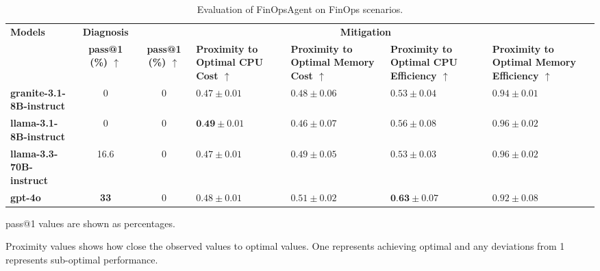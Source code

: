 \begin{table*}[h]
\small
\centering
\begin{threeparttable}
  \caption{Evaluation of FinOpsAgent on FinOps scenarios.}
  \label{tab:finopsagent-eval}
  \begin{tabular}{@{}lccp{1.85cm}p{1.85cm}p{1.85cm}p{1.85cm}@{}}
    \toprule
    \multirow{2}{*}{\textbf{Models}} 
      & \multicolumn{1}{c}{\textbf{Diagnosis}}
      & \multicolumn{5}{c}{\textbf{Mitigation}} \\
    \cmidrule(lr){2-2}\cmidrule(lr){3-7}
     & \textbf{pass@1 (\%) $\uparrow$} 
     & \textbf{pass@1 (\%) $\uparrow$} 
     & \textbf{Proximity to Optimal CPU Cost $\uparrow$} 
     & \textbf{Proximity to Optimal Memory Cost $\uparrow$} 
     & \textbf{Proximity to Optimal CPU Efficiency $\uparrow$} 
     & \textbf{Proximity to Optimal Memory Efficiency $\uparrow$} \\
    \midrule
    \textbf{granite-3.1-8B-instruct} 
      & 0 
      & 0 
      & $0.47 \pm 0.01$ 
      & \cellcolor[gray]{0.94} $0.48 \pm 0.06$ 
      & $0.53 \pm 0.04$ 
      & \cellcolor[gray]{0.93} $0.94 \pm 0.01$ \\
    \textbf{llama-3.1-8B-instruct} 
      & 0 
      & 0 
      & \cellcolor[gray]{0.85} $\textbf{0.49} \pm 0.01$ 
      & $0.46 \pm 0.07$ 
      & \cellcolor[gray]{0.95} $0.56 \pm 0.08$ 
      & \cellcolor[gray]{0.85} $0.96 \pm 0.02$ \\
    \textbf{llama-3.3-70B-instruct} 
      & \cellcolor[gray]{0.92} 16.6
      & 0 
      & $0.47 \pm 0.01$ 
      & \cellcolor[gray]{0.91} $0.49 \pm 0.05$ 
      & $0.53 \pm 0.03$ 
      & \cellcolor[gray]{0.85} $0.96 \pm 0.02$ \\
    \textbf{gpt-4o} 
      & \cellcolor[gray]{0.85} \textbf{33} 
      & 0 
      & \cellcolor[gray]{0.93} $0.48 \pm 0.01$ 
      & \cellcolor[gray]{0.85} $0.51 \pm 0.02$ 
      & \cellcolor[gray]{0.85} $\textbf{0.63} \pm 0.07$ 
      & $0.92 \pm 0.08$ \\
    \bottomrule
  \end{tabular}
  \begin{tablenotes}
    \scriptsize
    \item pass@1 values are shown as percentages. 
    \item Proximity values shows how close the observed values to optimal values. 
    One represents achieving optimal and any deviations from 1 represents sub-optimal performance.
  \end{tablenotes}
\end{threeparttable}
\end{table*}

